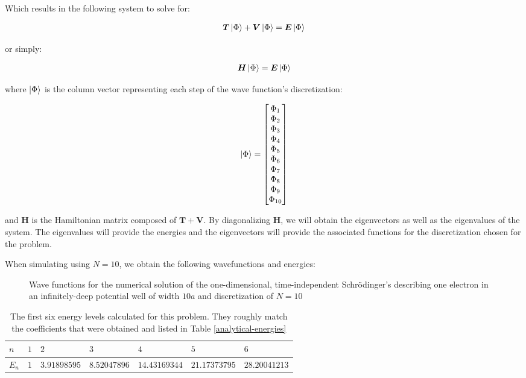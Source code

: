 \documentclass[10pt, oneside, letterpaper]{article}
\begin{document}
Which results in the following system to solve for:

\begin{align*}
\bm{T}\ket{\Phi} + \bm{V}\ket{\Phi} = \bm{E}\ket{\Phi}
\end{align*}

or simply:

\begin{align*}
\bm{H}\ket{\Phi} = \bm{E}\ket{\Phi}
\end{align*}

where $\ket{\Phi}$ is the column vector representing each step of the wave function's discretization:

\begin{align*}
\ket{\Phi} =
\begin{bmatrix}
 \Phi_1 \\
 \Phi_2 \\ 
 \Phi_3 \\ 
 \Phi_4 \\ 
 \Phi_5 \\ 
 \Phi_6 \\ 
 \Phi_7 \\ 
 \Phi_8 \\ 
 \Phi_9 \\ 
 \Phi_{10} \\ 
\end{bmatrix}
\end{align*}

and $\bm{H}$ is the Hamiltonian matrix composed of $\bm{T} + \bm{V}$. By diagonalizing $\bm{H}$, we will obtain the eigenvectors as well as the eigenvalues of the system. The eigenvalues will provide the energies and the eigenvectors will provide the associated functions for the discretization chosen for the problem.

When simulating using $N=10$, we obtain the following wavefunctions and energies:

\begin{figure}[H]
  \begin{center}
    
  \end{center}
  \caption{Wave functions for the numerical solution of the one-dimensional, time-independent Schr\"{o}dinger's describing one electron in an infinitely-deep potential well of width $10a$ and discretization of $N=10$}
  \label{numerical-plot}
\end{figure}

\begin{table}
\begin{center}
\begin{tabular}{l|llllll}\hline
$n$    & $1$    & $2$     & $3$     & $4$      & $5$      & $6$      \\\hline
$E_n$  & $1$  & $3.91898595$  & $8.52047896$  & $14.43169344$  & $21.17373795$  & $28.20041213$ \\\hline
\end{tabular}
\end{center}
  \caption{The first six energy levels calculated for this problem. They roughly match the coefficients that were obtained and listed in Table \ref{analytical-energies}}
  \label{numerical-energies-1}
\end{table}
\end{document}
